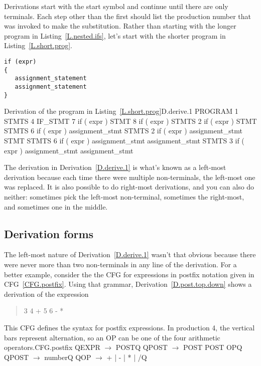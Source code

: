 \documentclass[letterpaper,12pt,openany,reqno]{book}%
\newcommand{\cfgprod}[2] {{\ttfamily #1} $\rightarrow$ {\ttfamily #2}}
\begin{document}
Derivations start with the start symbol and continue until there are only terminals. Each step other than the first should list the production number that was invoked to make the substitution. Rather than starting with the longer program in Listing~\ref{L.nested.ifs}, let's start with the shorter program in Listing~\ref{L.short.prog}.

\begin{lstlisting}[caption={Short program program in the language defined by the CFG in CFG~\ref{F.cfg.2}. The derivation of this program is given in Derivation~\ref{D.derive.1}},label=L.short.prog]
if (expr)
{
   assignment_statement
   assignment_statement
}
\end{lstlisting}

\begin{derivation}{Derivation of the program in Listing~\ref{L.short.prog}}{D.derive.1}
    PROGRAM
1   STMTS
4   IF_STMT
7   if ( expr ) STMT
8   if ( expr ) { STMTS }
2   if ( expr ) { STMT STMTS }
6   if ( expr ) { assignment_stmt STMTS }
2   if ( expr ) { assignment_stmt STMT STMTS }
6   if ( expr ) { assignment_stmt assignment_stmt STMTS }
3   if ( expr ) { assignment_stmt assignment_stmt }
\end{derivation}

The derivation in Derivation~\ref{D.derive.1} is what's known as a left-most derivation because each time there were multiple non-terminals, the left-most one was replaced. It is also possible to do right-most derivations, and you can also do neither: sometimes pick the left-most non-terminal, sometimes the right-most, and sometimes one in the middle.

\subsection{Derivation forms}\label{S.derive.forms}
The left-most nature of Derivation~\ref{D.derive.1} wasn't that obvious because there were never more than two non-terminals in any line of the derivation. For a better example, consider the the CFG for expressions in postfix notation given in CFG~\ref{CFG.postfix}. Using that grammar, Derivation~\ref{D.post.top.down} shows a derivation of the expression
\begin{quote}
3 4 + 5 6 - *
\end{quote}
\begin{cfg}{This CFG defines the syntax for postfix expressions. In production 4, the vertical bars represent alternation, so an OP can be one of the four arithmetic operators.}{CFG.postfix}
Q\cfgprod{EXPR}{POST}Q
Q\cfgprod{POST}{POST POST OP}Q
Q\cfgprod{POST}{number}Q
Q\cfgprod{OP}{+ | - | * | /}Q
\end{cfg}
\end{document}
